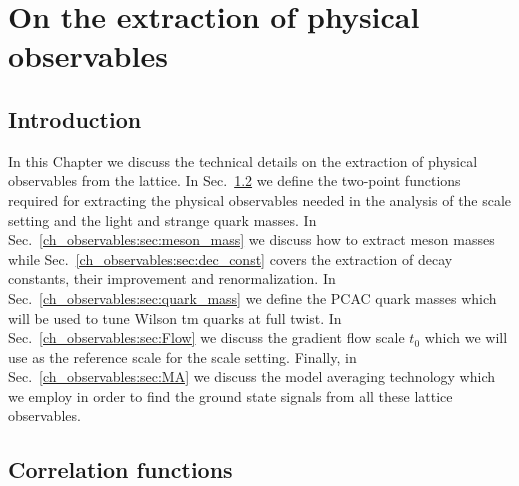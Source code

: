 \chapter{On the extraction of physical observables}%


\label{ch_observables}


\section{Introduction}
\label{ch_observables:sec:general}

In this Chapter we discuss the technical details on the extraction of physical observables from the lattice. In Sec.~\ref{ch_observables:sec:correlators} we define the two-point functions required for extracting the physical observables needed in the analysis of the scale setting and the light and strange quark masses. In Sec.~\ref{ch_observables:sec:meson_mass} we discuss how to extract meson masses while Sec.~\ref{ch_observables:sec:dec_const} covers the extraction of decay constants, their improvement and renormalization. In  Sec.~\ref{ch_observables:sec:quark_mass} we define the PCAC quark masses which will be used to tune Wilson tm quarks at full twist. In Sec.~\ref{ch_observables:sec:Flow} we discuss the gradient flow scale $t_0$ which we will use as the reference scale for the scale setting. Finally, in Sec.~\ref{ch_observables:sec:MA} we discuss the model averaging technology which we employ in order to find the ground state signals from all these lattice observables.


\section{Correlation functions}
\label{ch_observables:sec:correlators}

